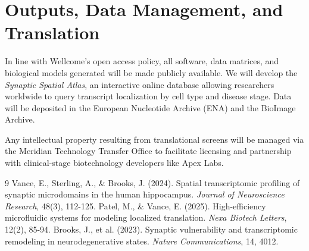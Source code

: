 \section{Outputs, Data Management, and Translation}

In line with Wellcome's open access policy, all software, data matrices, and biological models generated will be made publicly available. We will develop the \textit{Synaptic Spatial Atlas}, an interactive online database allowing researchers worldwide to query transcript localization by cell type and disease stage. Data will be deposited in the European Nucleotide Archive (ENA) and the BioImage Archive.

Any intellectual property resulting from translational screens will be managed via the Meridian Technology Transfer Office to facilitate licensing and partnership with clinical-stage biotechnology developers like Apex Labs.

\begin{thebibliography}{9}
\small
{}
Vance, E., Sterling, A., \& Brooks, J. (2024). Spatial transcriptomic profiling of synaptic microdomains in the human hippocampus. \textit{Journal of Neuroscience Research}, 48(3), 112-125.
Patel, M., \& Vance, E. (2025). High-efficiency microfluidic systems for modeling localized translation. \textit{Nexa Biotech Letters}, 12(2), 85-94.
Brooks, J., et al. (2023). Synaptic vulnerability and transcriptomic remodeling in neurodegenerative states. \textit{Nature Communications}, 14, 4012.
\end{thebibliography}
